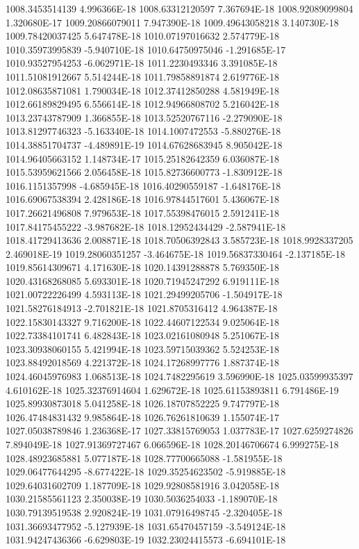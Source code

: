 1008.3453514139  4.996366E-18
1008.63312120597  7.367694E-18
1008.92089099804  1.320680E-17
1009.20866079011  7.947390E-18
1009.49643058218  3.140730E-18
1009.78420037425  5.647478E-18
1010.07197016632  2.574779E-18
1010.35973995839  -5.940710E-18
1010.64750975046  -1.291685E-17
1010.93527954253  -6.062971E-18
1011.2230493346  3.391085E-18
1011.51081912667  5.514244E-18
1011.79858891874  2.619776E-18
1012.08635871081  1.790034E-18
1012.37412850288  4.581949E-18
1012.66189829495  6.556614E-18
1012.94966808702  5.216042E-18
1013.23743787909  1.366855E-18
1013.52520767116  -2.279090E-18
1013.81297746323  -5.163340E-18
1014.1007472553  -5.880276E-18
1014.38851704737  -4.489891E-19
1014.67628683945  8.905042E-18
1014.96405663152  1.148734E-17
1015.25182642359  6.036087E-18
1015.53959621566  2.056458E-18
1015.82736600773  -1.830912E-18
1016.1151357998  -4.685945E-18
1016.40290559187  -1.648176E-18
1016.69067538394  2.428186E-18
1016.97844517601  5.436067E-18
1017.26621496808  7.979653E-18
1017.55398476015  2.591241E-18
1017.84175455222  -3.987682E-18
1018.12952434429  -2.587941E-18
1018.41729413636  2.008871E-18
1018.70506392843  3.585723E-18
1018.9928337205  2.469018E-19
1019.28060351257  -3.464675E-18
1019.56837330464  -2.137185E-18
1019.85614309671  4.171630E-18
1020.14391288878  5.769350E-18
1020.43168268085  5.693301E-18
1020.71945247292  6.919111E-18
1021.00722226499  4.593113E-18
1021.29499205706  -1.504917E-18
1021.58276184913  -2.701821E-18
1021.8705316412  4.964387E-18
1022.15830143327  9.716200E-18
1022.44607122534  9.025064E-18
1022.73384101741  6.482843E-18
1023.02161080948  5.251067E-18
1023.30938060155  5.421994E-18
1023.59715039362  5.524253E-18
1023.88492018569  4.221372E-18
1024.17268997776  1.887374E-18
1024.46045976983  1.068513E-18
1024.7482295619  3.596990E-18
1025.03599935397  4.610162E-18
1025.32376914604  1.629672E-18
1025.61153893811  6.791486E-19
1025.89930873018  5.041258E-18
1026.18707852225  9.747797E-18
1026.47484831432  9.985864E-18
1026.76261810639  1.155074E-17
1027.05038789846  1.236368E-17
1027.33815769053  1.037783E-17
1027.6259274826  7.894049E-18
1027.91369727467  6.066596E-18
1028.20146706674  6.999275E-18
1028.48923685881  5.077187E-18
1028.77700665088  -1.581955E-18
1029.06477644295  -8.677422E-18
1029.35254623502  -5.919885E-18
1029.64031602709  1.187709E-18
1029.92808581916  3.042058E-18
1030.21585561123  2.350038E-19
1030.5036254033  -1.189070E-18
1030.79139519538  2.920824E-19
1031.07916498745  -2.320405E-18
1031.36693477952  -5.127939E-18
1031.65470457159  -3.549124E-18
1031.94247436366  -6.629803E-19
1032.23024415573  -6.694101E-18
